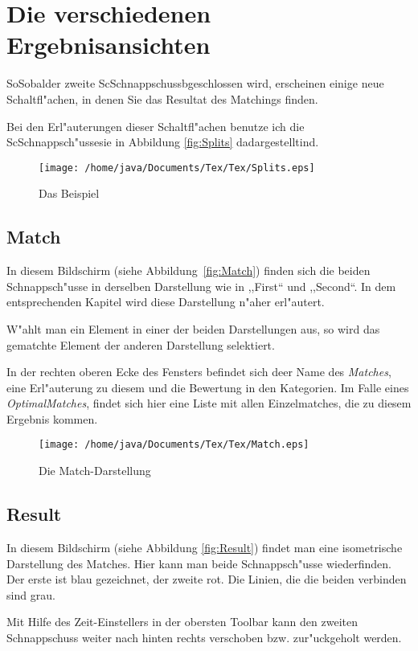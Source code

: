 \section{Die verschiedenen Ergebnisansichten}
SoSobalder zweite ScSchnappschussbgeschlossen wird, erscheinen einige neue Schaltfl"achen, in denen Sie das Resultat des Matchings finden.

Bei den Erl"auterungen dieser Schaltfl"achen benutze ich die ScSchnappsch"ussesie in Abbildung \vref{fig:Splits} dadargestelltind.
\begin{figure}
   \centering
   \texttt{[image: /home/java/Documents/Tex/Tex/Splits.eps]}
   \caption{Das Beispiel}
   \label{fig:Splits}
\end{figure}
\subsection{Match}
In diesem Bildschirm (siehe Abbildung~\vref{fig:Match}) finden sich die beiden Schnappsch"usse in derselben Darstellung wie in ,,First`` und ,,Second``. In dem entsprechenden Kapitel wird diese Darstellung n"aher erl"autert. 

W"ahlt man ein Element in einer der beiden Darstellungen aus, so wird das gematchte Element der anderen Darstellung selektiert. 

In der rechten oberen Ecke des Fensters befindet sich deer Name des \textit{Matches}, eine Erl"auterung zu diesem und die Bewertung in den Kategorien. Im Falle eines \textit{OptimalMatches}, findet sich hier eine Liste mit allen Einzelmatches, die zu diesem Ergebnis kommen.
\begin{figure}
   \centering
   \texttt{[image: /home/java/Documents/Tex/Tex/Match.eps]}
   \caption{Die Match-Darstellung}
   \label{fig:Match}
\end{figure}

\subsection{Result}
In diesem Bildschirm (siehe Abbildung \vref{fig:Result}) findet man eine isometrische Darstellung des Matches. Hier kann man  beide Schnappsch"usse wiederfinden. Der erste ist blau gezeichnet, der zweite rot. Die Linien, die die beiden verbinden sind grau. 

Mit Hilfe des Zeit-Einstellers in der obersten Toolbar kann den zweiten Schnappschuss weiter nach hinten rechts verschoben bzw. zur"uckgeholt werden. 

